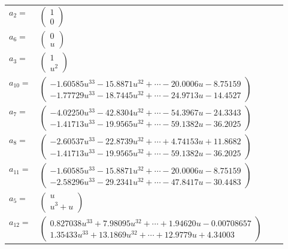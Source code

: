 \documentclass[1p]{elsarticle_modified}
\theoremstyle{definition}
\begin{document}
\begin{tabular}{m{7pt} m{180pt} m{7pt} m{180pt} }
\flushright $a_{2}=$&$\begin{pmatrix}1\\0\end{pmatrix}$ \\
\flushright $a_{6}=$&$\begin{pmatrix}0\\u\end{pmatrix}$ \\
\flushright $a_{3}=$&$\begin{pmatrix}1\\u^2\end{pmatrix}$ \\
\flushright $a_{10}=$&$\begin{pmatrix}-1.60585 u^{33}-15.8871 u^{32}+\cdots-20.0006 u-8.75159\\-1.77729 u^{33}-18.7445 u^{32}+\cdots-24.9713 u-14.4527\end{pmatrix}$ \\
\flushright $a_{7}=$&$\begin{pmatrix}-4.02250 u^{33}-42.8304 u^{32}+\cdots-54.3967 u-24.3343\\-1.41713 u^{33}-19.9565 u^{32}+\cdots-59.1382 u-36.2025\end{pmatrix}$ \\
\flushright $a_{8}=$&$\begin{pmatrix}-2.60537 u^{33}-22.8739 u^{32}+\cdots+4.74153 u+11.8682\\-1.41713 u^{33}-19.9565 u^{32}+\cdots-59.1382 u-36.2025\end{pmatrix}$ \\
\flushright $a_{11}=$&$\begin{pmatrix}-1.60585 u^{33}-15.8871 u^{32}+\cdots-20.0006 u-8.75159\\-2.58296 u^{33}-29.2341 u^{32}+\cdots-47.8417 u-30.4483\end{pmatrix}$ \\
\flushright $a_{5}=$&$\begin{pmatrix}u\\u^3+u\end{pmatrix}$ \\
\flushright $a_{12}=$&$\begin{pmatrix}0.827038 u^{33}+7.98095 u^{32}+\cdots+1.94620 u-0.00708657\\1.35433 u^{33}+13.1869 u^{32}+\cdots+12.9779 u+4.34003\end{pmatrix}$ \\

\end{tabular}
\end{document}
